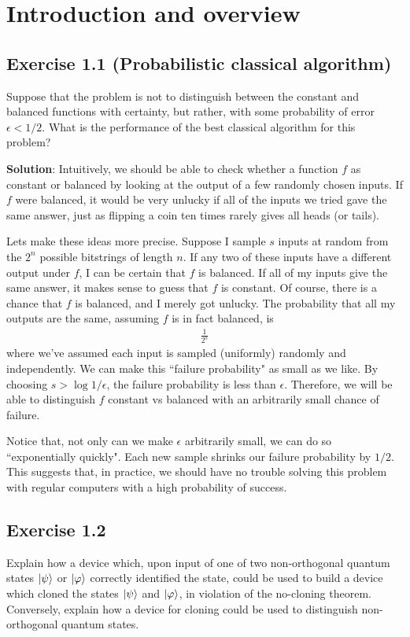 \documentclass{book}
\begin{document}
\chapter{Introduction and overview}

\section*{Exercise 1.1 (Probabilistic classical algorithm)}
    Suppose that the problem is not to distinguish between the constant and balanced functions with certainty, but rather, with some probability of error $\epsilon < 1/2$. What is the performance of the best classical algorithm for this problem?
    
    \textbf{Solution}: Intuitively, we should be able to check whether a function $f$ as constant or balanced by looking at the output of a few randomly chosen inputs. If $f$ were balanced, it would be very unlucky if all of the inputs we tried gave the same answer, just as flipping a coin ten times rarely gives all heads (or tails).
    
    Lets make these ideas more precise. Suppose I sample $s$ inputs at random from the $2^n$ possible bitstrings of length $n$. If any two of these inputs have a different output under $f$, I can be certain that $f$ is balanced. If all of my inputs give the same answer, it makes sense to guess that $f$ is constant. Of course, there is a chance that $f$ is balanced, and I merely got unlucky. The probability that all my outputs are the same, assuming $f$ is in fact balanced, is 
    \begin{align}
        \frac{1}{2^s}
    \end{align}
    where we've assumed each input is sampled (uniformly) randomly and independently. We can make this ``failure probability" as small as we like. By choosing $s > \log 1/\epsilon$, the failure probability is less than $\epsilon$. Therefore, we will be able to distinguish $f$ constant vs balanced with an arbitrarily small chance of failure.

    Notice that, not only can we make $\epsilon$ arbitrarily small, we can do so ``exponentially quickly". Each new sample shrinks our failure probability by $1/2$. This suggests that, in practice, we should have no trouble solving this problem with regular computers with a high probability of success.
    
\section*{Exercise 1.2}
    Explain how a device which, upon input of one of two non-orthogonal quantum states $\ket{\psi}$ or $\ket{\varphi}$ correctly identified the state, could be used to build a device which cloned the states $\ket{\psi}$ and $\ket{\varphi}$, in violation of the no-cloning theorem. Conversely, explain how a device for cloning could be used to distinguish non-orthogonal quantum states.
    
\end{document}
